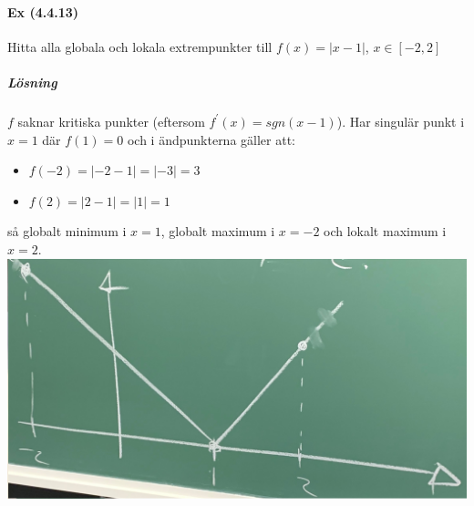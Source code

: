 \paragraph{Ex (4.4.13)} Hitta alla globala och lokala extrempunkter till $f(x)= |x-1|$, $x\in[-2,2]$
\subparagraph{Lösning} $f$ saknar kritiska punkter (eftersom $f^\prime(x)=sgn(x-1)$).
Har singulär punkt i $x=1$ där $f(1)=0$ och i ändpunkterna gäller att:
\begin{itemize}
    \item $f(-2)= | -2-1| = | -3|=3$
    \item $f(2)= | 2-1| = |1| = 1$
\end{itemize}
så globalt minimum i $x=1$, globalt maximum i $x=-2$ och lokalt maximum i $x=2$.\\
\includegraphics[scale=0.1]{lessons/lesson10/imgs/img05.jpg}\\
